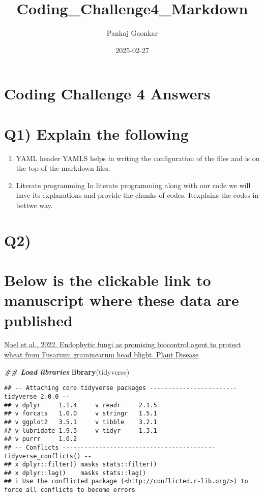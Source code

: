 \documentclass[
]{article}
\title{Coding\_Challenge4\_Markdown}
\author{Pankaj Gaonkar}
\date{2025-02-27}
\newenvironment{Shaded}{\begin{snugshade}}{\end{snugshade}}
\newcommand{\DocumentationTok}[1]{\textcolor[rgb]{0.56,0.35,0.01}{\textbf{\textit{#1}}}}
\newcommand{\FunctionTok}[1]{\textcolor[rgb]{0.13,0.29,0.53}{\textbf{#1}}}
\newcommand{\NormalTok}[1]{#1}
\begin{document}
\maketitle

\section{Coding Challenge 4 Answers}\label{coding-challenge-4-answers}

\section{Q1) Explain the following}\label{q1-explain-the-following}

\begin{enumerate}
\def\labelenumi{\alph{enumi}.}
\item
  YAML header YAMLS helps in writing the configuration of the files and
  is on the top of the markdown files.
\item
  Literate programming In literate programming along with our code we
  will have its explanations and provide the chunks of codes. Itexplains
  the codes in bettwe way.
\end{enumerate}

\section{Q2)}\label{q2}

\section{Below is the clickable link to manuscript where these data are
published}\label{below-is-the-clickable-link-to-manuscript-where-these-data-are-published}

\href{https://doi.org/10.1094/PDIS-06-21-1253-RE}{Noel et al., 2022.
Endophytic fungi as promising biocontrol agent to protect wheat from
Fusarium graminearum head blight. Plant Disease}

\begin{Shaded}
\begin{Highlighting}[]
\DocumentationTok{\#\# Load libraries}
\FunctionTok{library}\NormalTok{(tidyverse)}
\end{Highlighting}
\end{Shaded}

\begin{verbatim}
## -- Attaching core tidyverse packages ------------------------ tidyverse 2.0.0 --
## v dplyr     1.1.4     v readr     2.1.5
## v forcats   1.0.0     v stringr   1.5.1
## v ggplot2   3.5.1     v tibble    3.2.1
## v lubridate 1.9.3     v tidyr     1.3.1
## v purrr     1.0.2     
## -- Conflicts ------------------------------------------ tidyverse_conflicts() --
## x dplyr::filter() masks stats::filter()
## x dplyr::lag()    masks stats::lag()
## i Use the conflicted package (<http://conflicted.r-lib.org/>) to force all conflicts to become errors
\end{verbatim}
\end{document}
